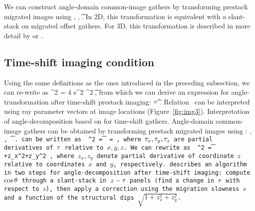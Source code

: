 We can construct
angle-domain common-image gathers
by transforming prestack migrated images
using 
\beq \label{eqn:XSTKa}
\RR \lp \mm, \hh \rp  \Longrightarrow 
\RR \lp \mm, \t  \rp \;.
\eeq
In 2D, this transformation is equivalent with a slant-stack
on migrated offset gathers. For 3D, this transformation
is described in more detail by \cite{Fomel.seg.3dadcig} or
\cite{SavaFomel.pag}.

\subsection{Time-shift imaging condition}
Using the same definitions as the ones introduced in the 
preceding subsection, we can re-write 
as
\beq
\mpm^2 = 4 s^2 \cos^2 \t \;,
\eeq
from which we can derive an expression for angle-transformation
after time-shift prestack imaging:
\beq \label{eqn:angT}
\cos \t =  \;.
\eeq
Relation~ can be interpreted using ray parameter vectors
at image locations (Figure~\ref{fig:img3}).
{Interpretation of angle-decomposition based on 
for time-shift gathers.}
Angle-domain common-image gathers can be obtained 
by transforming prestack migrated images using :
\beq \label{eqn:TSTKa}
\RR \lp \mm, \tt \rp \Longrightarrow 
\RR \lp \mm, \t  \rp \;.
\eeq
{} can be written as
\beq  \label{eqn:angTcart}
\cos^2 \t 
= 
=  \;,
\eeq
where $\tt_x,\tt_y,\tt_z$ are partial derivatives of $\tt$
relative to $x,y,z$.
We can rewrite  as
\beq \label{eqn:angTalg}
\cos^2 \t =  +z_x^2+z_y^2 \rp \;,
\eeq
where $z_x,z_y$ denote partial derivative of coordinate $z$
relative to coordinates $x$ and $y$, respectively.
 describes an algorithm in two steps
for angle-decomposition after time-shift imaging:
compute $\cos \t$ through a slant-stack in $z-\tt$ panels
(find a change in $\tt$ with respect to $z$),
then apply a correction using the migration slowness $s$ and
a function of the structural dips $\sqrt{1+z_x^2+z_y^2}$.

